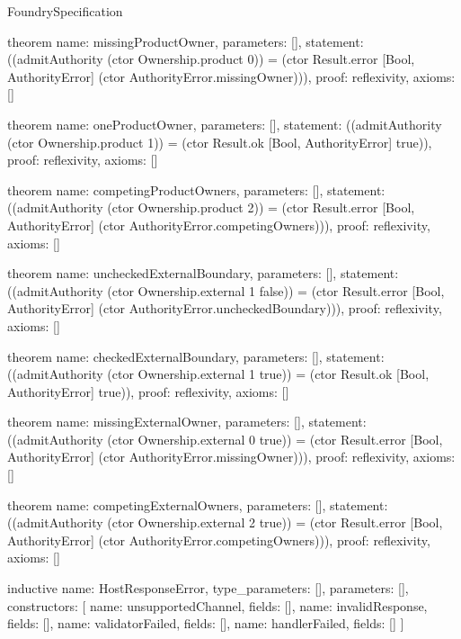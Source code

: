\begin{lexlean}{FoundrySpecification}
\begin{semanticmodule}
theorem{
  name: missingProductOwner,
  parameters: [],
  statement: ((admitAuthority (ctor Ownership.product 0)) = (ctor Result.error [Bool, AuthorityError] (ctor AuthorityError.missingOwner))),
  proof: reflexivity{},
  axioms: []
}

theorem{
  name: oneProductOwner,
  parameters: [],
  statement: ((admitAuthority (ctor Ownership.product 1)) = (ctor Result.ok [Bool, AuthorityError] true)),
  proof: reflexivity{},
  axioms: []
}

theorem{
  name: competingProductOwners,
  parameters: [],
  statement: ((admitAuthority (ctor Ownership.product 2)) = (ctor Result.error [Bool, AuthorityError] (ctor AuthorityError.competingOwners))),
  proof: reflexivity{},
  axioms: []
}

theorem{
  name: uncheckedExternalBoundary,
  parameters: [],
  statement: ((admitAuthority (ctor Ownership.external 1 false)) = (ctor Result.error [Bool, AuthorityError] (ctor AuthorityError.uncheckedBoundary))),
  proof: reflexivity{},
  axioms: []
}

theorem{
  name: checkedExternalBoundary,
  parameters: [],
  statement: ((admitAuthority (ctor Ownership.external 1 true)) = (ctor Result.ok [Bool, AuthorityError] true)),
  proof: reflexivity{},
  axioms: []
}

theorem{
  name: missingExternalOwner,
  parameters: [],
  statement: ((admitAuthority (ctor Ownership.external 0 true)) = (ctor Result.error [Bool, AuthorityError] (ctor AuthorityError.missingOwner))),
  proof: reflexivity{},
  axioms: []
}

theorem{
  name: competingExternalOwners,
  parameters: [],
  statement: ((admitAuthority (ctor Ownership.external 2 true)) = (ctor Result.error [Bool, AuthorityError] (ctor AuthorityError.competingOwners))),
  proof: reflexivity{},
  axioms: []
}

inductive{
  name: HostResponseError,
  type_parameters: [],
  parameters: [],
  constructors: [
    {name: unsupportedChannel, fields: []},
    {name: invalidResponse, fields: []},
    {name: validatorFailed, fields: []},
    {name: handlerFailed, fields: []}
  ]
}


\end{semanticmodule}
\end{lexlean}
